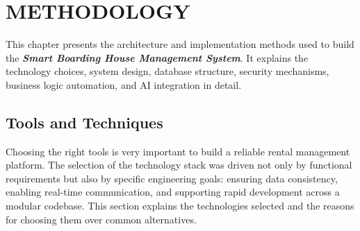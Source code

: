 \chapter{METHODOLOGY}

This chapter presents the architecture and implementation methods used to build the \textit{\textbf{Smart Boarding House Management System}}. It explains the technology choices, system design, database structure, security mechanisms, business logic automation, and AI integration in detail.

\section{Tools and Techniques}

Choosing the right tools is very important to build a reliable rental management platform. The selection of the technology stack was driven not only by functional requirements but also by specific engineering goals: ensuring data consistency, enabling real-time communication, and supporting rapid development across a modular codebase. This section explains the technologies selected and the reasons for choosing them over common alternatives.


